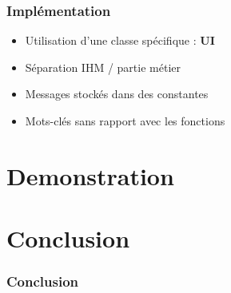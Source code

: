 \documentclass{beamer}
\begin{document}
\begin{frame}
   \frametitle{Implémentation}
  \begin{itemize}
  \item Utilisation d'une classe spécifique : \textbf{UI}
  \item Séparation IHM / partie métier
  \item Messages stockés dans des constantes
  \item Mots-clés sans rapport avec les fonctions
  \end{itemize} 
\end{frame}

\author{PATTYN Maxime}

\section{Demonstration}
\begin{frame}
  
\end{frame}


\section{Conclusion}
\begin{frame}
  \frametitle{Conclusion}
\end{frame}
\end{document}

